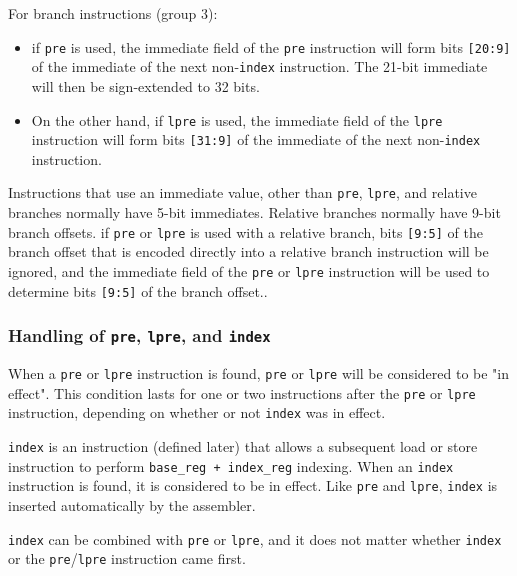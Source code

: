 \documentclass{article}
\begin{document}
	For branch instructions (group 3):
	\begin{itemize}
	\item if \texttt{pre} is used, the
	immediate field of the \texttt{pre} instruction will form bits
	\texttt{[20:9]} of the immediate of the next non-\texttt{index}
	instruction. The 21-bit immediate will then be sign-extended to 32
	bits.

	\item On the other hand, if \texttt{lpre} is used, the immediate
	field of the \texttt{lpre} instruction will form bits
	\texttt{[31:9]} of the immediate of the next non-\texttt{index}
	instruction.
	\end{itemize}

	Instructions that use an immediate value, other than \texttt{pre},
	\texttt{lpre}, and relative branches normally have 5-bit immediates.
	Relative branches normally have 9-bit branch offsets. if \texttt{pre}
	or \texttt{lpre} is used with a relative branch, bits \texttt{[9:5]} of
	the branch offset that is encoded directly into a relative branch
	instruction will be ignored, and the immediate field of the
	\texttt{pre} or \texttt{lpre} instruction will be used to determine
	bits \texttt{[9:5]} of the branch offset..

	\subsubsection{Handling of \texttt{pre}, \texttt{lpre}, and
	\texttt{index}}

	When a \texttt{pre} or \texttt{lpre} instruction is found, \texttt{pre}
	or \texttt{lpre} will be considered to be "in effect". This condition
	lasts for one or two instructions after the \texttt{pre} or
	\texttt{lpre} instruction, depending on whether or not \texttt{index}
	was in effect.

	\texttt{index} is an instruction (defined later) that allows a
	subsequent load or store instruction to perform \texttt{base\_reg +
	index\_reg} indexing. When an \texttt{index} instruction is found, it
	is considered to be in effect. Like \texttt{pre} and \texttt{lpre},
	\texttt{index} is inserted automatically by the assembler.

	\texttt{index} can be combined with \texttt{pre} or \texttt{lpre}, and
	it does not matter whether \texttt{index} or the
	\texttt{pre}/\texttt{lpre} instruction came first.

\end{document}
